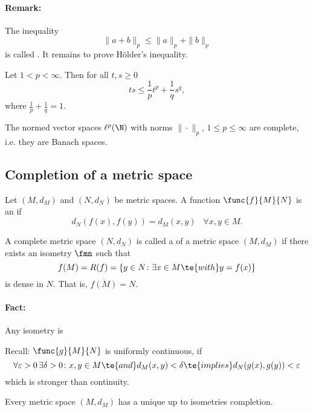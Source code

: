 \paragraph{Remark:}
The inequality
\[\|a+b\|_p\leq\|a\|_p+\|b\|_p\]
is called . It remains to prove Hölder's inequality.

\begin{lem}\label{i.23}
    Let $1<p<\infty$. Then for all $t,s\geq0$
    \[ts\leq\frac{1}{p}t^p+\frac{1}{q}s^q\label{1.15}\tag{1.15},\]
    where $\frac{1}{p}+\frac{1}{q}=1$.
\end{lem}

\begin{thm}\label{i.24}
    The normed vector spaces $\ell^p(\N)$ with norms $\|\cdot\|_p$, $1\leq p\leq\infty$ are complete, 
    i.e. they are Banach spaces.
\end{thm}

\subsection{Completion of a metric space}

\begin{definition}\label{i.25}
    Let $(M,d_M)$ and $(N,d_N)$ be metric spaces. A function $\func{f}{M}{N}$ is an  if
    \[d_N(f(x),f(y))=d_M(x,y)\;\;\;\forall x,y\in M.\]
\end{definition}

\begin{definition}\label{i.26}
    A complete metric space $(N,d_N)$ is called a  
    of a metric space $(M,d_M)$ if there exists an isometry $\fmn$ such that
    \[f(M)=R(f)=\{y\in N\colon \exists x\in M\te{ with }y=f(x)\}\]
    is dense in $N$. That is, $\overline{f(M)}=N.$
\end{definition}

\paragraph{Fact:}
Any isometry is 

Recall: $\func{g}{M}{N}$ is uniformly continuous, if
\[\forall\varepsilon>0\,\exists\delta>0\colon x,y\in M\te{ and }d_M(x,y)<\delta\te{ implies }d_N(g(x),g(y))<\varepsilon\]
which is stronger than continuity.

\begin{thm}\label{i.27}
    Every metric space $(M,d_M)$ has a unique \rec{(}up to isometries\rec{)} completion.
\end{thm}